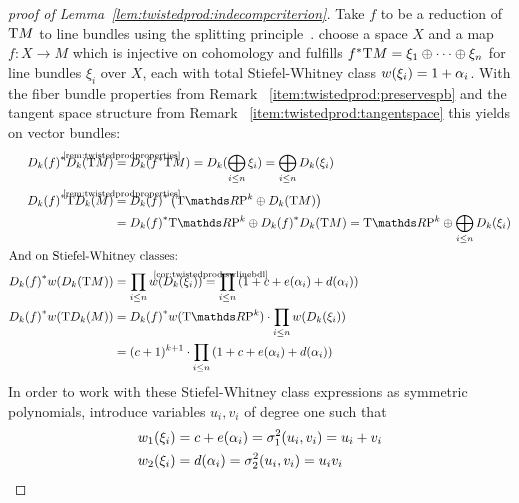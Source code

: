 \begin{proof}[proof of Lemma~\ref{lem:twistedprod:indecompcriterion}]
  Take $f$ to be a reduction of $\mathrm{T}M$ to line bundles
  using the splitting principle~\cite[Theorem~(19.3.9)]{tomdieck}.
  \Idest choose a space $X$ and a map $f\colon X\to M$ which is
  injective on cohomology and fulfills
  ${f}^* \mathrm{T}M = \xi_1\oplus\dotsb\oplus\xi_n$ for line bundles
  $\xi_i$ over $X$, each with total Stiefel-Whitney class
  ${w}(\xi_i)=1+\alpha_i$.
  With the fiber bundle properties from
  Remark~%
  \ref{item:twistedprod:preservespb}
  and the tangent space structure from
  Remark~%
  \ref{item:twistedprod:tangentspace}
  this yields on vector bundles:
  \begin{align*}
    \pb{\Twistedprod{k}{f}} \Twistedprod{k}{\T M}
    &\cequalsby{\ref{rem:twistedprodproperties}}
      \Twistedprod{k}{\pb f \T M}
      = \Twistedprod{k}{\bigoplus_{i\leq n}\xi_i}
      = \bigoplus_{i\leq n}\Twistedprod{k}{\xi_i}
    \\
    \pb{\Twistedprod{k}{f}} \T{\Twistedprod{k}{M}}
    &\cequalsby{\ref{rem:twistedprodproperties}}
      \pb{\Twistedprod{k}{f}} \left(
      \T{\RP k} \oplus \Twistedprod{k}{\T M}
      \right)\\
    &= \pb{\Twistedprod{k}{f}} \T{\RP k}
      \oplus
      \pb{\Twistedprod{k}{f}} \Twistedprod{k}{\T M}
      = \T{\RP k} \oplus \bigoplus_{i\leq n}\Twistedprod{k}{\xi_i}\\
    \intertext{And on Stiefel-Whitney classes:}
    \pb{\Twistedprod{k}{f}} \W{\Twistedprod{k}{\T M}}
    &= \prod_{i\leq n} \W{\Twistedprod{k}{\xi_i}}
      \cequalsby{\ref{cor:twistedprod:swlinebdl}}
      \prod_{i\leq n} \left(1 + c + e(\alpha_i) + d(\alpha_i)\right)
    \\
    \pb{\Twistedprod{k}{f}} \W{\T\Twistedprod{k}{M}}
    &= \pb{\Twistedprod{k}{f}}\W{\T{\RP k}}
      \cdot \prod_{i\leq n} \W{\Twistedprod{k}{\xi_i}} \\
    &= (c+1)^{k+1}
      \cdot \prod_{i\leq n} \left(1+c+e(\alpha_i)+d(\alpha_i)\right)
  \end{align*}
  In order to work with these Stiefel-Whitney class expressions as
  symmetric polynomials, introduce variables $u_i, v_i$ of degree
  one such that
  \begin{align*}
    \w1{\xi_i} &= c+e(\alpha_i) = \el 1 2(u_i, v_i) = u_i+v_i \\
    \w2{\xi_i} &= d(\alpha_i)   = \el 2 2(u_i, v_i) = u_iv_i \\

\end{align*}
\end{proof}
